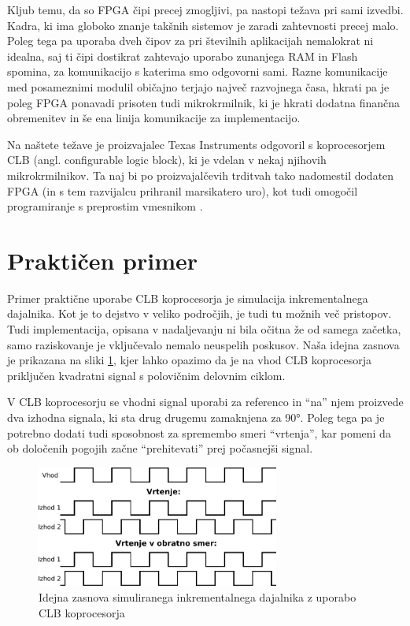 \documentclass[a4paper]{article}
\begin{document}
\begin{sloppypar}
Kljub temu, da so FPGA čipi precej zmogljivi, pa nastopi težava pri sami
izvedbi. Kadra, ki ima globoko znanje takšnih sistemov je zaradi zahtevnosti
precej malo. Poleg tega pa uporaba dveh čipov za pri številnih aplikacijah
nemalokrat ni idealna, saj ti čipi dostikrat zahtevajo uporabo zunanjega RAM in
Flash spomina, za komunikacijo s katerima smo odgovorni sami. Razne
komunikacije med posameznimi modulil običajno terjajo največ razvojnega časa,
hkrati pa je poleg FPGA ponavadi prisoten tudi mikrokrmilnik, ki je hkrati
dodatna finančna obremenitev in še ena linija komunikacije za implementacijo.

Na naštete težave je proizvajalec Texas Instruments odgovoril s koprocesorjem
CLB (angl. configurable logic block), ki je vdelan v nekaj njihovih
mikrokrmilnikov. Ta naj bi po proizvajalčevih trditvah tako nadomestil dodaten
FPGA (in s tem razvijalcu prihranil marsikatero uro), kot tudi omogočil
programiranje s preprostim vmesnikom \cite{clb-intro}.



\section{Praktičen primer}

Primer praktične uporabe CLB koprocesorja je simulacija inkrementalnega
dajalnika. Kot je to dejstvo v veliko področjih, je tudi tu možnih več
pristopov. Tudi implementacija, opisana v nadaljevanju ni bila očitna že od
samega začetka, samo raziskovanje je vključevalo nemalo neuspelih poskusov.
Naša idejna zasnova je prikazana na sliki \ref{fig:enkoder_zasnova}, kjer lahko
opazimo da je na vhod CLB koprocesorja priključen kvadratni signal s polovičnim
delovnim ciklom.

V CLB koprocesorju se vhodni signal uporabi za referenco in ``na'' njem
proizvede dva izhodna signala, ki sta drug drugemu zamaknjena za 90°. Poleg
tega pa je potrebno dodati tudi sposobnost za spremembo smeri ``vrtenja'', kar
pomeni da ob določenih pogojih začne ``prehitevati'' prej počasnejši signal.

\begin{figure}[htb]
    \centerline{\includegraphics[width=8cm]{enkoder_zasnova}}
    \caption{Idejna zasnova simuliranega inkrementalnega dajalnika z uporabo
             CLB koprocesorja}
    \label{fig:enkoder_zasnova} 
\end{figure} 


\end{sloppypar}
\end{document}
